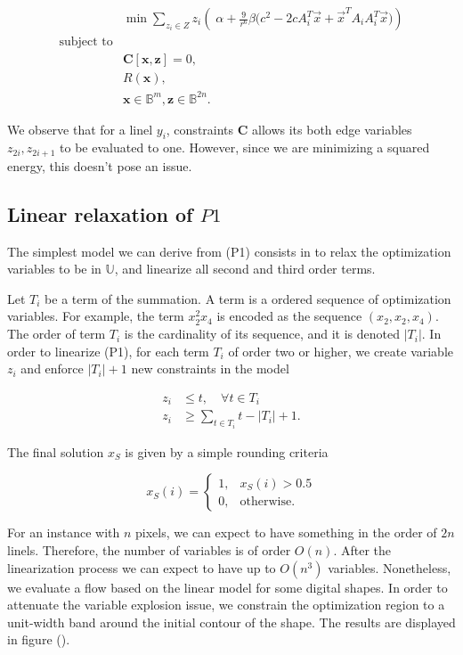 \[
\begin{array}{ll}
& \displaystyle	\min \sum_{z_i \in Z}{ z_i \left(\; \alpha + \frac{9}{r^6}\beta \big(c^2 - 2cA_i^T\vec{x} + \vec{x}^TA_iA_i^T\vec{x}\big)\right)} \\
\text{subject to}\\
&	\mathbf{C}[ \mathbf{x}, \mathbf{z}] = 0,\\
&   R(\mathbf{x}),\\
&   \mathbf{x} \in \mathbb{B}^{m}, \mathbf{z} \in \mathbb{B}^{2n}.
\end{array}
\]


We observe that for a linel $y_i$, constraints $\mathbf{C}$ allows its both edge variables $z_{2i},z_{2i+1}$ to be evaluated to one. However, since we are minimizing a squared energy, this doesn't pose an issue.




\subsection{Linear relaxation of $P1$}

	The simplest model we can derive from (P1) consists in to relax the optimization variables to be in $\mathbb{U}$, and linearize all second and third order terms. 
	
	Let $T_i$ be a term of the summation. A term is a ordered sequence of optimization variables. For example, the term $x_2^2x_4$ is encoded as the sequence $(x_2,x_2,x_4)$. The order of term $T_i$ is the cardinality of its sequence, and it is denoted $|T_i|$. In order to linearize (P1), for each term $T_i$ of order two or higher, we create variable $z_i$ and enforce $|T_i|+1$ new constraints in the model
	
	\begin{align*}
		z_i &\leq t, \quad \forall t \in T_i \\
		z_i &\geq \sum_{t \in T_i}{t} - |T_i| + 1.		
	\end{align*}

	The final solution $x_S$ is given by a simple rounding criteria
	
\[
	x_S(i) = \left\{ \begin{array}{ll}

		 	1,& x_S(i) > 0.5\\
		 	0,& \text{otherwise}.
 	
	\end{array}\right.
\]	

	For an instance with $n$ pixels, we can expect to have something in the order of $2n$ linels. Therefore, the number of variables is of order $O(n)$. After the linearization process we can expect to have up to $O(n^3)$ variables. Nonetheless, we evaluate a flow based on the linear model for some digital shapes. In order to attenuate the variable explosion issue, we constrain the optimization region to a unit-width band around the initial contour of the shape. The results are displayed in figure ().
	


